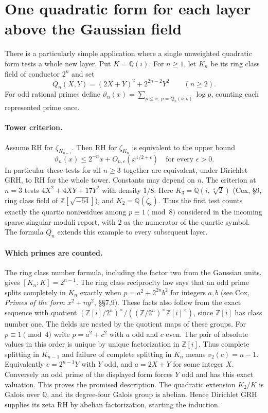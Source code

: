 \section{One quadratic form for each layer above the Gaussian field}
\label{sec:gaussian}

There is a particularly simple application where a single
unweighted quadratic form tests a whole new layer. Put $K=\mathbb Q(i)$.
For $n\ge1$, let $K_n$ be its ring class field of conductor $2^n$ and set
\[
 Q_n(X,Y)=(2X+Y)^2+2^{2n-2}Y^2\qquad(n\ge2).
\]
For odd rational primes define
$\vartheta_n(x)=\sum_{p\le x,\ p=Q_n(a,b)}\log p$,
counting each represented prime once.

\paragraph{Tower criterion.}
Assume RH for $\zeta_{K_{n-1}}$. Then RH for $\zeta_{K_n}$ is
equivalent to the upper bound
\[
              \vartheta_n(x)\le 2^{-n}x+
                         O_{n,\epsilon}(x^{1/2+\epsilon})
              \quad\text{for every }\epsilon>0 .
\]
In particular these tests for all $n\ge3$ together are equivalent, under
Dirichlet GRH, to RH for the whole tower. Constants may depend on $n$.
The criterion at $n=3$ tests $4X^2+4XY+17Y^2$ with density $1/8$.
Here $K_3=\mathbb Q(i,\sqrt[4]{2})$ (Cox, \S9, ring class field
of $\mathbb Z[\sqrt{-64}]$), and $K_2=\mathbb Q(\zeta_8)$.
Thus the first test counts exactly the quartic nonresidues among
$p\equiv1\pmod8$ considered in the incoming sparse singular-moduli
report, with $2$ as the numerator of the quartic symbol.
The formula $Q_n$ extends this example to every subsequent layer.

\paragraph{Which primes are counted.}
The ring class number formula, including the factor two from the
Gaussian units, gives $[K_n:K]=2^{n-1}$.
The ring class reciprocity law says that an odd prime splits completely
in $K_n$ exactly when $p=a^2+2^{2n}b^2$ for integers $a,b$
(see Cox, \emph{Primes of the form $x^2+ny^2$}, \S\S7,9).
These facts also follow from the exact sequence with quotient
$(\mathbb Z[i]/2^n)^\times/((\mathbb Z/2^n)^\times\mathbb Z[i]^\times)$,
since $\mathbb Z[i]$ has class number one. The fields are nested by
the quotient maps of these groups. For $p\equiv1\pmod 4$ write
$p=a^2+c^2$ with $a$ odd and $c$ even. The pair of absolute values in
this order is unique by unique factorization in $\mathbb Z[i]$.
Thus complete splitting in $K_{n-1}$ and failure of complete splitting
in $K_n$ means $v_2(c)=n-1$. Equivalently $c=2^{n-1}Y$ with $Y$ odd,
and $a=2X+Y$ for some integer $X$. Conversely an odd prime of the displayed
form forces $Y$ odd and has this exact valuation. This proves the promised
description. The quadratic extension $K_2/K$ is Galois over $\mathbb Q$,
and its degree-four Galois group is abelian. Hence Dirichlet GRH supplies
its zeta RH by abelian factorization, starting the induction.

